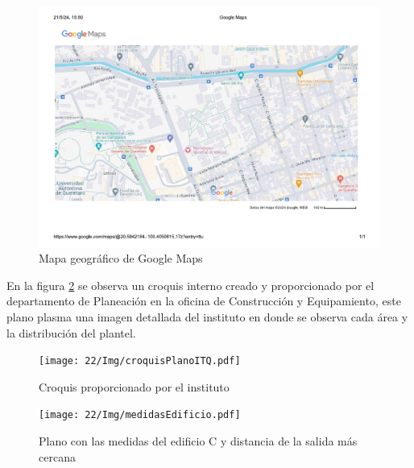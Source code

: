     \begin{figure}[H] 
        \centering
        \includegraphics[trim = {12mm 20mm 10mm 14mm},clip,scale=0.45]{22/Img/planoDeUbicacionEnMaps.pdf}
        \caption{Mapa geográfico de Google Maps}
        \label{fig:croquisGoogle}
    \end{figure}
    
    
    En la figura \ref{fig:croquisPlano} se observa un croquis interno creado y proporcionado por el departamento de Planeación en la oficina de Construcción y Equipamiento, este plano plasma una imagen detallada del instituto en donde se observa cada área y la distribución del plantel. 
    \begin{figure}[H] 
        \centering
        \texttt{[image: 22/Img/croquisPlanoITQ.pdf]}
        \caption{Croquis proporcionado por el instituto}
        \label{fig:croquisPlano}
    \end{figure}
    
    \begin{figure}[H] 
        \centering
        \texttt{[image: 22/Img/medidasEdificio.pdf]}
        \caption{Plano con las medidas del edificio C y distancia de la salida más cercana}
        \label{fig:medidas}
    \end{figure}
    
    
    
